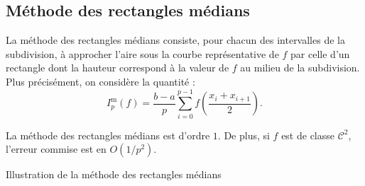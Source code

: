 \subsection{Méthode des rectangles médians}

La méthode des rectangles médians consiste, pour chacun des intervalles de la subdivision, à approcher l'aire sous la courbe représentative de $f$ par celle d'un rectangle dont la hauteur correspond à la valeur de $f$ au milieu de la subdivision. Plus précisément, on considère la quantité :
\[
I_p^\mathrm{m}(f) = \frac{b-a}{p} \sum_{i=0}^{p-1} f\left(\frac{x_i + x_{i+1}}{2} \right).
\]

\begin{prop}{}{}
La méthode des rectangles médians est d'ordre $1$. De plus, si $f$ est de classe $\mathscr{C}^2$, l'erreur commise est en $O(1/p^2)$.
\end{prop}

\begin{marginfigure}[-3cm]
    \centering
    
    \caption{Illustration de la méthode des rectangles médians}
\end{marginfigure}



